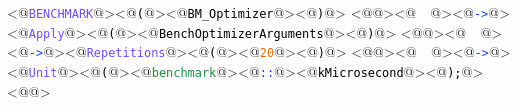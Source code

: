 <@\textcolor[HTML]{724BFF}{\texttt{BENCHMARK}}@><@\textcolor[HTML]{000000}{\texttt{(}}@><@\textcolor[HTML]{000000}{\texttt{BM\_Optimizer}}@><@\textcolor[HTML]{000000}{\texttt{)}}@>
<@\textcolor[HTML]{000000}{\texttt{}}@><@\textcolor[HTML]{000000}{\texttt{\ \ }}@><@\textcolor[HTML]{1041FF}{\texttt{->}}@><@\textcolor[HTML]{724BFF}{\texttt{Apply}}@><@\textcolor[HTML]{000000}{\texttt{(}}@><@\textcolor[HTML]{000000}{\texttt{BenchOptimizerArguments}}@><@\textcolor[HTML]{000000}{\texttt{)}}@>
<@\textcolor[HTML]{000000}{\texttt{}}@><@\textcolor[HTML]{000000}{\texttt{\ \ }}@><@\textcolor[HTML]{1041FF}{\texttt{->}}@><@\textcolor[HTML]{724BFF}{\texttt{Repetitions}}@><@\textcolor[HTML]{000000}{\texttt{(}}@><@\textcolor[HTML]{DE6F10}{\texttt{20}}@><@\textcolor[HTML]{000000}{\texttt{)}}@>
<@\textcolor[HTML]{000000}{\texttt{}}@><@\textcolor[HTML]{000000}{\texttt{\ \ }}@><@\textcolor[HTML]{1041FF}{\texttt{->}}@><@\textcolor[HTML]{724BFF}{\texttt{Unit}}@><@\textcolor[HTML]{000000}{\texttt{(}}@><@\textcolor[HTML]{1F8F42}{\texttt{benchmark}}@><@\textcolor[HTML]{1041FF}{\texttt{::}}@><@\textcolor[HTML]{000000}{\texttt{kMicrosecond}}@><@\textcolor[HTML]{000000}{\texttt{);}}@>
<@\textcolor[HTML]{000000}{\texttt{}}@>